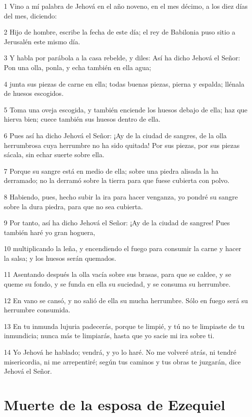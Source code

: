 \par 1 Vino a mí palabra de Jehová en el año noveno, en el mes décimo, a los diez días del mes, diciendo:
\par 2 Hijo de hombre, escribe la fecha de este día; el rey de Babilonia puso sitio a Jerusalén este mismo día.
\par 3 Y habla por parábola a la casa rebelde, y diles: Así ha dicho Jehová el Señor: Pon una olla, ponla, y echa también en ella agua;
\par 4 junta sus piezas de carne en ella; todas buenas piezas, pierna y espalda; llénala de huesos escogidos.
\par 5 Toma una oveja escogida, y también enciende los huesos debajo de ella; haz que hierva bien; cuece también sus huesos dentro de ella.
\par 6 Pues así ha dicho Jehová el Señor: ¡Ay de la ciudad de sangres, de la olla herrumbrosa cuya herrumbre no ha sido quitada! Por sus piezas, por sus piezas sácala, sin echar suerte sobre ella.
\par 7 Porque su sangre está en medio de ella; sobre una piedra alisada la ha derramado; no la derramó sobre la tierra para que fuese cubierta con polvo.
\par 8 Habiendo, pues, hecho subir la ira para hacer venganza, yo pondré su sangre sobre la dura piedra, para que no sea cubierta.
\par 9 Por tanto, así ha dicho Jehová el Señor: ¡Ay de la ciudad de sangres! Pues también haré yo gran hoguera,
\par 10 multiplicando la leña, y encendiendo el fuego para consumir la carne y hacer la salsa; y los huesos serán quemados.
\par 11 Asentando después la olla vacía sobre sus brasas, para que se caldee, y se queme su fondo, y se funda en ella su suciedad, y se consuma su herrumbre.
\par 12 En vano se cansó, y no salió de ella su mucha herrumbre. Sólo en fuego será su herrumbre consumida.
\par 13 En tu inmunda lujuria padecerás, porque te limpié, y tú no te limpiaste de tu inmundicia; nunca más te limpiarás, hasta que yo sacie mi ira sobre ti.
\par 14 Yo Jehová he hablado; vendrá, y yo lo haré. No me volveré atrás, ni tendré misericordia, ni me arrepentiré; según tus caminos y tus obras te juzgarán, dice Jehová el Señor.

\section*{Muerte de la esposa de Ezequiel}


